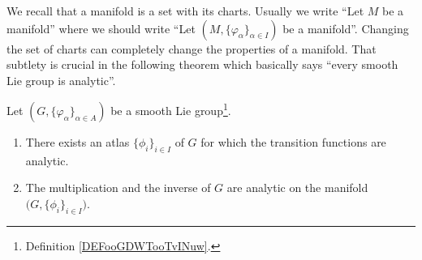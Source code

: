 We recall that a manifold is a set with its charts. Usually we write ``Let \( M\) be a manifold'' where we should write ``Let \( (M,\{ \varphi_{\alpha} \}_{\alpha\in I})\) be a manifold''. Changing the set of charts can completely change the properties of a manifold. That subtlety is crucial in the following theorem which basically says ``every smooth Lie group is analytic''.
\begin{theorem}       \label{THOooSQVCooCyEPOS}
	Let \( (G,\{ \varphi_{\alpha} \}_{\alpha\in A})\) be a smooth Lie group\footnote{Definition \ref{DEFooGDWTooTvINuw}.}.
	\begin{enumerate}
		\item
		      There exists an atlas \( \{ \phi_i \}_{i\in I}\) of \( G\) for which the transition functions are analytic.
		\item
		      The multiplication and the inverse of \( G\) are analytic on the manifold \( \big( G,\{ \phi_i \}_{i\in I} \big)\).
	\end{enumerate}
\end{theorem}



